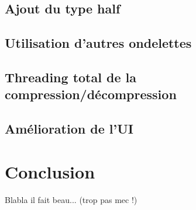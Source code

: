 \documentclass[a4paper,12pt]{article}
\begin{document}
	\subsection{Ajout du type half}

	\subsection{Utilisation d'autres ondelettes}

	\subsection{Threading total de la compression/décompression}

	\subsection{Amélioration de l'UI}

\newpage

\section*{Conclusion}
Blabla il fait beau... (trop pas mec !)
\end{document}
